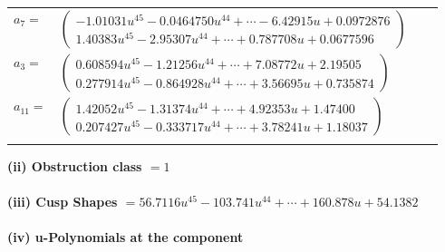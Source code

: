 \documentclass[1p]{elsarticle_modified}
\theoremstyle{definition}
\begin{document}
\begin{tabular}{m{7pt} m{180pt} m{7pt} m{180pt} }
\flushright $a_{7}=$&$\begin{pmatrix}-1.01031 u^{45}-0.0464750 u^{44}+\cdots-6.42915 u+0.0972876\\1.40383 u^{45}-2.95307 u^{44}+\cdots+0.787708 u+0.0677596\end{pmatrix}$ \\
\flushright $a_{3}=$&$\begin{pmatrix}0.608594 u^{45}-1.21256 u^{44}+\cdots+7.08772 u+2.19505\\0.277914 u^{45}-0.864928 u^{44}+\cdots+3.56695 u+0.735874\end{pmatrix}$ \\
\flushright $a_{11}=$&$\begin{pmatrix}1.42052 u^{45}-1.31374 u^{44}+\cdots+4.92353 u+1.47400\\0.207427 u^{45}-0.333717 u^{44}+\cdots+3.78241 u+1.18037\end{pmatrix}$\\&\end{tabular}
\flushleft \textbf{(ii) Obstruction class $= 1$}\\~\\
\flushleft \textbf{(iii) Cusp Shapes $= 56.7116 u^{45}-103.741 u^{44}+\cdots+160.878 u+54.1382$}\\~\\
\newpage\renewcommand{\arraystretch}{1}
\flushleft \textbf{(iv) u-Polynomials at the component}\newline \\
\end{document}
